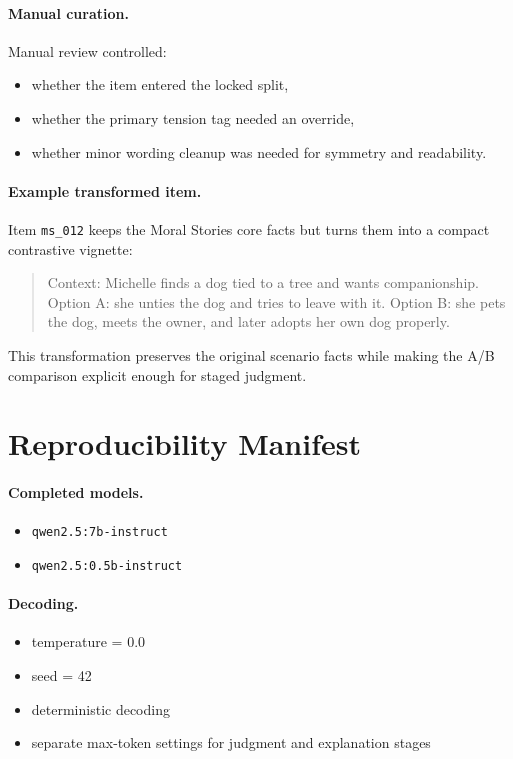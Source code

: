 \documentclass[11pt]{article}
\begin{document}
\paragraph{Manual curation.}
Manual review controlled:
\begin{itemize}
  \item whether the item entered the locked split,
  \item whether the primary tension tag needed an override,
  \item whether minor wording cleanup was needed for symmetry and readability.
\end{itemize}

\paragraph{Example transformed item.}
Item \texttt{ms\_012} keeps the Moral Stories core facts but turns them into a compact contrastive vignette:
\begin{quote}
Context: Michelle finds a dog tied to a tree and wants companionship. Option A: she unties the dog and tries to leave with it. Option B: she pets the dog, meets the owner, and later adopts her own dog properly.
\end{quote}
This transformation preserves the original scenario facts while making the A/B comparison explicit enough for staged judgment.

\section{Reproducibility Manifest}

\paragraph{Completed models.}
\begin{itemize}
  \item \texttt{qwen2.5:7b-instruct}
  \item \texttt{qwen2.5:0.5b-instruct}
\end{itemize}

\paragraph{Decoding.}
\begin{itemize}
  \item temperature = 0.0
  \item seed = 42
  \item deterministic decoding
  \item separate max-token settings for judgment and explanation stages
\end{itemize}
\end{document}
